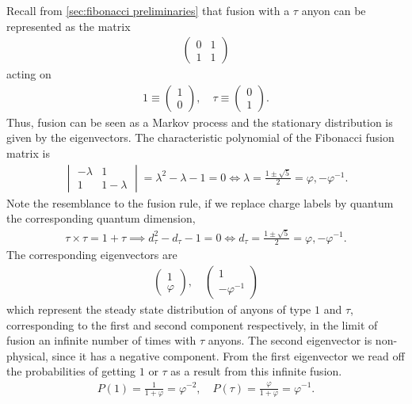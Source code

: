 \documentclass[a4paper,10pt,oneside]{book}
\theoremstyle{plain}
\theoremstyle{definition}
\theoremstyle{remark}
\begin{document}
Recall from \cref{sec:fibonacci preliminaries} that fusion with a $\tau$ anyon can be represented as the matrix
\begin{align}
  \begin{pmatrix}
    0 & 1 \\
    1 & 1
  \end{pmatrix}
\end{align}
acting on
\begin{align}
  1 \equiv \begin{pmatrix} 1 \\ 0 \end{pmatrix}, \quad \tau \equiv \begin{pmatrix} 0 \\ 1 \end{pmatrix}.
\end{align}
Thus, fusion can be seen as a Markov process and the stationary distribution is given by the eigenvectors. The characteristic polynomial of the Fibonacci fusion matrix is
\begin{align}
  \begin{vmatrix}
    -λ & 1 \\
    1 & 1-λ
  \end{vmatrix} =
  λ^2-λ-1 = 0 \iff \lambda = \frac{1±\sqrt{5}}{2} = φ, -φ^{-1}.
\end{align}
Note the resemblance to the fusion rule, if we replace charge labels by quantum the corresponding quantum dimension,
\begin{align}
  τ × τ = 1 + τ \implies d_τ^2 - d_τ - 1 = 0 \iff d_τ = \frac{1±\sqrt{5}}{2} = φ, -φ^{-1}.
\end{align}
The corresponding eigenvectors are
\begin{align}
  \begin{pmatrix}
    1 \\ φ
  \end{pmatrix}, \quad
  \begin{pmatrix}
    1 \\ -φ^{-1}
  \end{pmatrix}
\end{align}
which represent the steady state distribution of anyons of type $1$ and $τ$, corresponding to the first and second component respectively, in the limit of fusion an infinite number of times with $τ$ anyons. The second eigenvector is non-physical, since it has a negative component. From the first eigenvector we read off the probabilities of getting $1$ or $\tau$ as a result from this infinite fusion.
\begin{align}
  P(1) = \frac{1}{1+φ} = φ^{-2}, \quad
  P(τ) = \frac{φ}{1+φ} = φ^{-1}.
\end{align}
\end{document}
